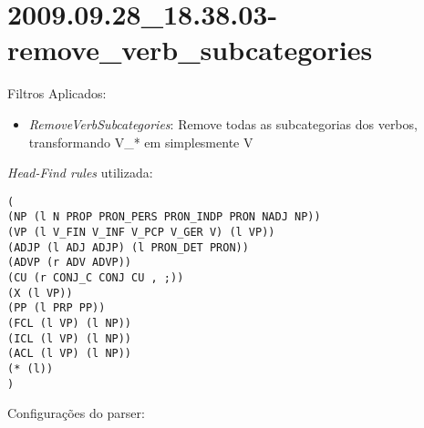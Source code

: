 \section{2009.09.28_18.38.03-remove_verb_subcategories} %
\label{sec:exp:2009.09.28_18.38.03-remove_verb_subcategories}

Filtros Aplicados:

\begin{itemize}
  
  \item{\emph{RemoveVerbSubcategories}: Remove todas as subcategorias dos verbos, transformando V_* em simplesmente V}
  
\end{itemize}

\emph{Head-Find rules} utilizada:

\scriptsize
\begin{verbatim}
(
(NP (l N PROP PRON_PERS PRON_INDP PRON NADJ NP))
(VP (l V_FIN V_INF V_PCP V_GER V) (l VP))
(ADJP (l ADJ ADJP) (l PRON_DET PRON))
(ADVP (r ADV ADVP))
(CU (r CONJ_C CONJ CU , ;))
(X (l VP))
(PP (l PRP PP))
(FCL (l VP) (l NP))
(ICL (l VP) (l NP))
(ACL (l VP) (l NP))
(* (l))
)

\end{verbatim}

\normalsize

Configurações do parser:

